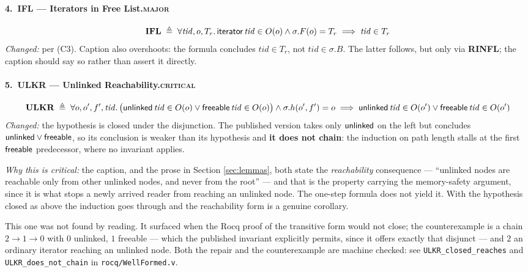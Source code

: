 \paragraph{4.\ IFL --- Iterators in Free List.\hfill\textsc{major}}
\[
\textbf{IFL} \;\triangleq\; \forall \mathit{tid},o,T_{r} \ldotp
  \textsf{iterator}\,\mathit{tid} \in O(o) \land \sigma.F(o) = T_{r} \implies \mathit{tid} \in T_{r}
\]
\emph{Changed:} per (C3).  Caption also overshoots: the formula concludes
$\mathit{tid} \in T_{r}$, not $\mathit{tid} \in \sigma.B$.  The latter follows,
but only via \textbf{RINFL}; the caption should say so rather than assert it
directly.

\paragraph{5.\ ULKR --- Unlinked Reachability.\hfill\textsc{critical}}
\[
\textbf{ULKR} \;\triangleq\; \forall o,o',f',\mathit{tid} \ldotp
  \big(\textsf{unlinked}\,\mathit{tid} \in O(o) \lor \textsf{freeable}\,\mathit{tid} \in O(o)\big)
  \land \sigma.h(o',f') = o
  \implies \textsf{unlinked}\,\mathit{tid} \in O(o') \lor \textsf{freeable}\,\mathit{tid} \in O(o')
\]
\emph{Changed:} the hypothesis is closed under the disjunction.  The published
version takes only $\textsf{unlinked}$ on the left but concludes $\textsf{unlinked} \lor \textsf{freeable}$, so its
conclusion is weaker than its hypothesis and \textbf{it does not chain}: the
induction on path length stalls at the first $\textsf{freeable}$ predecessor, where no
invariant applies.

\emph{Why this is critical:} the caption, and the prose in Section
\ref{sec:lemmas}, both state the \emph{reachability} consequence --- ``unlinked
nodes are reachable only from other unlinked nodes, and never from the root'' ---
and that is the property carrying the memory-safety argument, since it is what
stops a newly arrived reader from reaching an unlinked node.  The one-step
formula does not yield it.  With the hypothesis closed as above the induction
goes through and the reachability form is a genuine corollary.

This one was not found by reading.  It surfaced when the Rocq proof of the
transitive form would not close; the counterexample is a chain $2 \to 1 \to 0$
with $0$ unlinked, $1$ freeable --- which the published invariant explicitly
permits, since it offers exactly that disjunct --- and $2$ an ordinary iterator
reaching an unlinked node.  Both the repair and the counterexample are machine
checked: see \texttt{ULKR\_closed\_reaches} and \texttt{ULKR\_does\_not\_chain}
in \texttt{rocq/WellFormed.v}.

